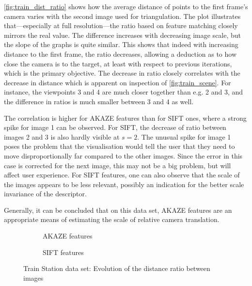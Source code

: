 \autoref{fig:train_dist_ratio} shows how the average distance of points to the
first frame's camera varies with the second image used for triangulation. The
plot illustrates that---especially at full resolution---the ratio based on
feature matching closely mirrors the real value. The difference increases with
decreasing image scale, but the slope of the graphs is quite similar. This
shows that indeed with increasing distance to the first frame, the ratio
decreases, allowing a deduction as to how close the camera is to the target, at
least with respect to previous iterations, which is the primary objective. 
The decrease in ratio closely correlates with the decrease in distance which
is apparent on inspection of \autoref{fig:train_scene}. For instance, the viewpoints
3 and 4 are much closer together than e.g. 2 and 3, and the difference in ratios
is much smaller between 3 and 4 as well. 

The correlation is higher for AKAZE
features than for SIFT ones, where a strong spike for image 1 can be observed.
For SIFT, the decrease of ratio between images 2 and 3 is also hardly visible at
$s=2$. The unusual spike for image 1 poses the problem that the visualisation
would tell the user that they need to move disproportionally far compared to
the other images. Since the error in this case is corrected for the next image,
this may not be a big problem, but will affect user experience. For SIFT
features, one can also observe that the scale of the images appears to be less
relevant, possibly an indication for the better scale invariance of the
descriptor.

Generally, it can be concluded that on this data set, AKAZE features are an
appropriate means of estimating the scale of relative camera translation.

\begin{figure}[h]
   \begin{subfigure}{.5\linewidth}
      \centering      
      
      \caption{AKAZE features}
      \label{fig:train_KAZE_dist_ratio}
   \end{subfigure}
   \quad
   \begin{subfigure}{.5\linewidth}
      \centering      
      
      \caption{SIFT features}
      \label{fig:train_SIFT_dist_ratio}
   \end{subfigure}
   \caption[Train data: Distance ratio]{Train Station data set: Evolution of the distance ratio between images}
   \label{fig:train_dist_ratio}
\end{figure}

